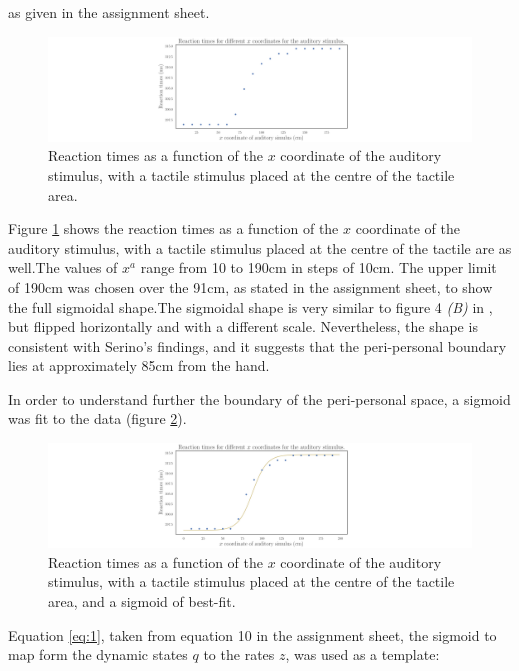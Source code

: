 \documentclass[12pt]{article}
\begin{document}
as given in the assignment sheet.

\begin{figure}[h!]
	\centering
	\hspace*{-1.9in}
	\includegraphics[width=1.5\linewidth]{fig/4-2.png}
	\caption{Reaction times as a function of the $x$ coordinate of the auditory stimulus, with a tactile stimulus placed at the centre of the tactile area.}
	\label{fig:3.4.2}
\end{figure}

Figure \ref{fig:3.4.2} shows the reaction times as a function of the $x$ coordinate of the auditory stimulus, with a tactile stimulus placed at the centre of the tactile are as well.The values of $x^a$ range from 10 to 190cm in steps of 10cm. The upper limit of 190cm was chosen over the 91cm, as stated in the assignment sheet, to show the full sigmoidal shape.The sigmoidal shape is very similar to figure 4 \textit{(B)} in \cite{Serino2015}, but flipped horizontally and with a different scale. Nevertheless, the shape is consistent with Serino's findings, and it suggests that the peri-personal boundary lies at approximately 85cm from the hand.

In order to understand further the boundary of the peri-personal space, a sigmoid was fit to the data (figure \ref{fig:3.4.3}).

\begin{figure}[h!]
	\centering
	\hspace*{-1.9in}
	\includegraphics[width=1.5\linewidth]{fig/4-3.png}
	\caption{Reaction times as a function of the $x$ coordinate of the auditory stimulus, with a tactile stimulus placed at the centre of the tactile area, and a sigmoid of best-fit.}
	\label{fig:3.4.3}
\end{figure}

Equation \ref{eq:1}, taken from equation 10 in the assignment sheet, the sigmoid to map form the dynamic states $q$ to the rates $z$, was used as a template:
\end{document}
